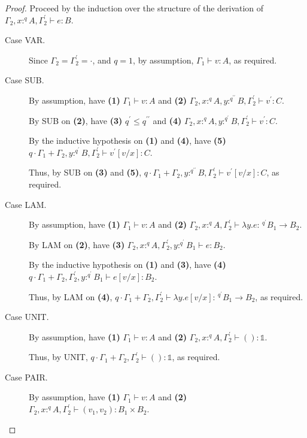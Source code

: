 \documentclass[acmsmall,screen,nonacm]{acmart}
\newcommand{\unit}{\mathbb{1}}
\newcommand{\tee}{\vdash}
\begin{document}
\begin{proof}
  Proceed by the induction over the structure of the derivation of $\Gamma_2, x :^q A, \Gamma_2^\prime \tee e : B$.
  \begin{description}
    \item[Case VAR.]
    Since $\Gamma_2 = \Gamma_2^\prime = \cdot$, and $q = 1$, by assumption, $\Gamma_1 \tee v : A$, as required.
    \\
    \item[Case SUB.]
    By assumption, have \textbf{(1)} $\Gamma_1 \tee v : A$ and \textbf{(2)} $\Gamma_2, x :^q A, y :^{q^{\prime\prime}} B, \Gamma_2^\prime \tee v^\prime : C$.

    By SUB on \textbf{(2)}, have \textbf{(3)} $q^\prime \le q^{\prime\prime}$ and \textbf{(4)} $\Gamma_2, x :^q A, y :^{q^\prime} B, \Gamma_2^\prime \tee v^\prime : C$.

    By the inductive hypothesis on \textbf{(1)} and \textbf{(4)}, have \textbf{(5)} $q \cdot \Gamma_1 + \Gamma_2, y :^{q^\prime} B, \Gamma_2^\prime \tee v^\prime[v/x] : C$.
    
    Thus, by SUB on \textbf{(3)} and \textbf{(5)}, $q \cdot \Gamma_1 + \Gamma_2, y :^{q^{\prime\prime}} B, \Gamma_2^\prime \tee v^\prime[v/x] : C$, as required.
    \\
    \item[Case LAM.] 
    By assumption, have \textbf{(1)} $\Gamma_1 \tee v : A$ and \textbf{(2)} $\Gamma_2, x :^q A, \Gamma_2^\prime \tee \lambda y.e : \,^{q^\prime} B_1 \rightarrow B_2$.

    By LAM on \textbf{(2)}, have \textbf{(3)} $\Gamma_2, x :^q A, \Gamma_2^\prime, y :^{q^\prime} B_1 \tee e : B_2$.

    By the inductive hypothesis on \textbf{(1)} and \textbf{(3)}, have \textbf{(4)} $q \cdot \Gamma_1 + \Gamma_2, \Gamma_2^\prime, y :^{q^\prime} B_1 \tee e[v/x] : B_2$.

    Thus, by LAM on \textbf{(4)}, $q \cdot \Gamma_1 + \Gamma_2, \Gamma_2^\prime \tee \lambda y.e[v/x] : \,^{q^\prime} B_1 \rightarrow B_2$, as required.
    \\
    \item[Case UNIT.]
    By assumption, have \textbf{(1)} $\Gamma_1 \tee v : A$ and \textbf{(2)} $\Gamma_2, x :^q A, \Gamma_2^\prime \tee () : \unit$.

    Thus, by UNIT, $q \cdot \Gamma_1 + \Gamma_2, \Gamma_2^\prime \tee () : \unit$, as required.
    \\
    \item[Case PAIR.] 
    By assumption, have \textbf{(1)} $\Gamma_1 \tee v : A$ and \textbf{(2)} $\Gamma_2, x :^q A, \Gamma_2^\prime \tee (v_1, v_2) : B_1 \times B_2$.
    

\end{description}
\end{proof}
\end{document}
